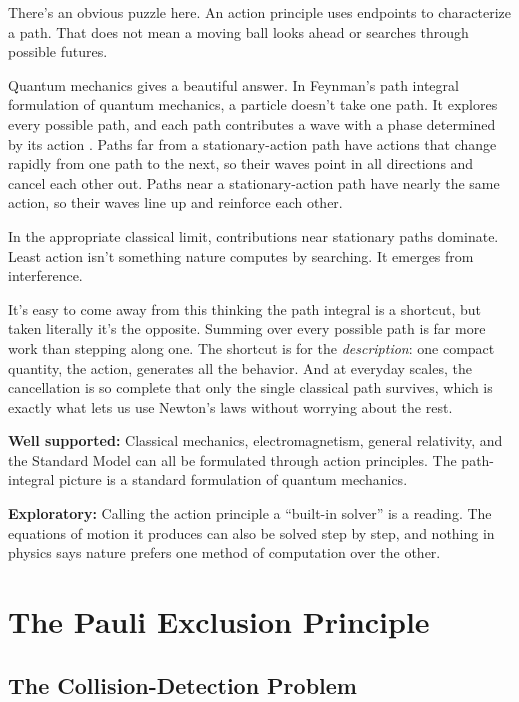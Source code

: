 There's an obvious puzzle here. An action principle uses endpoints to characterize a path. That does not mean a moving ball looks ahead or searches through possible futures.

Quantum mechanics gives a beautiful answer. In Feynman's path integral formulation of quantum mechanics, a particle doesn't take one path. It explores every possible path, and each path contributes a wave with a phase determined by its action \cite{feynmanhibbs1965}. Paths far from a stationary-action path have actions that change rapidly from one path to the next, so their waves point in all directions and cancel each other out. Paths near a stationary-action path have nearly the same action, so their waves line up and reinforce each other.

In the appropriate classical limit, contributions near stationary paths dominate. Least action isn't something nature computes by searching. It emerges from interference.

\begin{beginnermistakebox}
It's easy to come away from this thinking the path integral is a shortcut, but taken literally it's the opposite. Summing over every possible path is far more work than stepping along one. The shortcut is for the \emph{description}: one compact quantity, the action, generates all the behavior. And at everyday scales, the cancellation is so complete that only the single classical path survives, which is exactly what lets us use Newton's laws without worrying about the rest.
\end{beginnermistakebox}

\begin{researchnotebox}
\textbf{Well supported:} Classical mechanics, electromagnetism, general relativity, and the Standard Model can all be formulated through action principles. The path-integral picture is a standard formulation of quantum mechanics.

\textbf{Exploratory:} Calling the action principle a ``built-in solver'' is a reading. The equations of motion it produces can also be solved step by step, and nothing in physics says nature prefers one method of computation over the other.
\end{researchnotebox}

\section{The Pauli Exclusion Principle}

\subsection{The Collision-Detection Problem}

